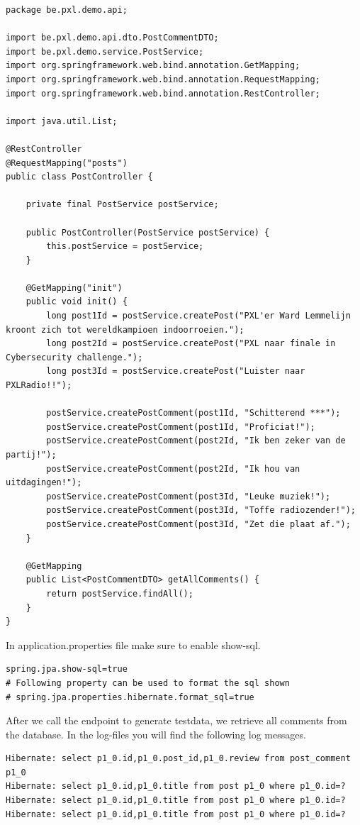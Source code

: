 \begin{lstlisting}
package be.pxl.demo.api;

import be.pxl.demo.api.dto.PostCommentDTO;
import be.pxl.demo.service.PostService;
import org.springframework.web.bind.annotation.GetMapping;
import org.springframework.web.bind.annotation.RequestMapping;
import org.springframework.web.bind.annotation.RestController;

import java.util.List;

@RestController
@RequestMapping("posts")
public class PostController {

    private final PostService postService;

    public PostController(PostService postService) {
        this.postService = postService;
    }

    @GetMapping("init")
    public void init() {
        long post1Id = postService.createPost("PXL'er Ward Lemmelijn kroont zich tot wereldkampioen indoorroeien.");
        long post2Id = postService.createPost("PXL naar finale in Cybersecurity challenge.");
        long post3Id = postService.createPost("Luister naar PXLRadio!!");

        postService.createPostComment(post1Id, "Schitterend ***");
        postService.createPostComment(post1Id, "Proficiat!");
        postService.createPostComment(post2Id, "Ik ben zeker van de partij!");
        postService.createPostComment(post2Id, "Ik hou van uitdagingen!");
        postService.createPostComment(post3Id, "Leuke muziek!");
        postService.createPostComment(post3Id, "Toffe radiozender!");
        postService.createPostComment(post3Id, "Zet die plaat af.");
    }

    @GetMapping
    public List<PostCommentDTO> getAllComments() {
        return postService.findAll();
    }
}
\end{lstlisting}

In application.properties file make sure to enable show-sql.

\begin{lstlisting}
spring.jpa.show-sql=true
# Following property can be used to format the sql shown
# spring.jpa.properties.hibernate.format_sql=true 
\end{lstlisting}

After we call the endpoint to generate testdata, we retrieve all comments from the database.
In the log-files you will find the following log messages.

\begin{lstlisting}
Hibernate: select p1_0.id,p1_0.post_id,p1_0.review from post_comment p1_0
Hibernate: select p1_0.id,p1_0.title from post p1_0 where p1_0.id=?
Hibernate: select p1_0.id,p1_0.title from post p1_0 where p1_0.id=?
Hibernate: select p1_0.id,p1_0.title from post p1_0 where p1_0.id=?
\end{lstlisting}

